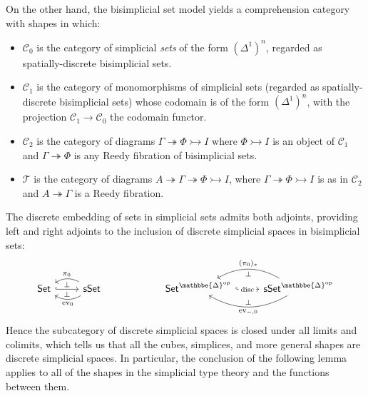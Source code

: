 \documentclass{amsart}
\theoremstyle{plain}
\theoremstyle{definition}
\theoremstyle{remark}
\numberwithin{equation}{section}
\newcommand{\Set}{\mathsf{Set}}
\newcommand{\sSet}{\mathsf{sSet}}
\newcommand{\DDelta}{\mathbbe{\Delta}}
\newcommand{\op}{\mathrm{op}}
\newcommand{\C}{\mathcal{C}}
\newcommand{\T}{\mathcal{T}}
\begin{document}
On the other hand, the bisimplicial set model yields a comprehension category with shapes in which:
\begin{itemize}
\item $\C_0$ is the category of simplicial \emph{sets} of the form $(\Delta^1)^n$, regarded as spatially-discrete bisimplicial sets.
\item $\C_1$ is the category of monomorphisms of simplicial sets (regarded as spatially-discrete bisimplicial sets) whose codomain is of the form $(\Delta^1)^n$, with the projection $\C_1\to\C_0$ the codomain functor.
\item $\C_2$ is the category of diagrams $\Gamma \twoheadrightarrow \Phi\rightarrowtail I$ where $\Phi\rightarrowtail I$ is an object of $\C_1$ and $\Gamma\twoheadrightarrow \Phi$ is any Reedy fibration of bisimplicial sets.
\item $\T$ is the category of diagrams $A \twoheadrightarrow \Gamma \twoheadrightarrow \Phi\rightarrowtail I$, where $\Gamma \twoheadrightarrow \Phi\rightarrowtail I$ is as in $\C_2$ and $A \twoheadrightarrow \Gamma$ is a Reedy fibration.
\end{itemize}

The discrete embedding of sets in simplicial sets admits both adjoints, providing left and right adjoints to the inclusion of discrete simplicial spaces in bisimplicial sets:
\[
\begin{tikzcd}[row sep=large]
\Set \arrow[r, hook, "\perp", "\perp"'] & \sSet \arrow[l, bend right, "\pi_0"'] \arrow[l, bend left, "\mathrm{ev}_0"] & \rightsquigarrow & \Set^{\DDelta^\op} \arrow[r, hook, "{\mathrm{disc}}" description] & \sSet^{\DDelta^\op} \arrow[l, bend right, "(\pi_0)_*"', "\perp"] \arrow[l, bend left, "\mathrm{ev}_{-,0}", "\perp"'] 
\end{tikzcd}
\]
Hence the subcategory of discrete simplicial spaces is closed under all limits and colimits, which tells us that all the cubes, simplices, and more general shapes are discrete simplicial spaces. In particular, the conclusion of the following lemma applies to all of the shapes in the simplicial type theory and the functions between them.
\end{document}
